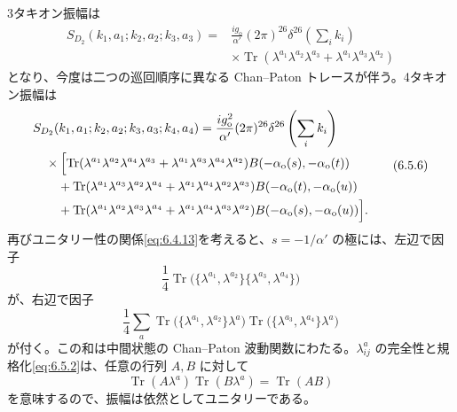 3タキオン振幅は
\begin{equation}
\begin{aligned}
S_{D_2}(k_1,a_1;k_2,a_2;k_3,a_3)
={}&\frac{ig_{\mathrm o}}{\alpha'}(2\pi)^{26}
\delta^{26}\left(\sum_i k_i\right)\\
&\times\operatorname{Tr}
(\lambda^{a_1}\lambda^{a_2}\lambda^{a_3}
+\lambda^{a_1}\lambda^{a_3}\lambda^{a_2})
\end{aligned}
\tag{6.5.5}\label{eq:6.5.5}
\end{equation}
となり、今度は二つの巡回順序に異なる Chan--Paton トレースが伴う。4タキオン振幅は
\begin{equation}
\begin{aligned}
&S_{D_2}(k_1,a_1;k_2,a_2;k_3,a_3;k_4,a_4)
=\frac{ig_{\mathrm o}^2}{\alpha'}(2\pi)^{26}
\delta^{26}\left(\sum_i k_i\right)\\
&\quad\times\Bigl[
\operatorname{Tr}(\lambda^{a_1}\lambda^{a_2}\lambda^{a_4}\lambda^{a_3}
+\lambda^{a_1}\lambda^{a_3}\lambda^{a_4}\lambda^{a_2})
B(-\alpha_{\mathrm o}(s),-\alpha_{\mathrm o}(t))\\
&\qquad+
\operatorname{Tr}(\lambda^{a_1}\lambda^{a_3}\lambda^{a_2}\lambda^{a_4}
+\lambda^{a_1}\lambda^{a_4}\lambda^{a_2}\lambda^{a_3})
B(-\alpha_{\mathrm o}(t),-\alpha_{\mathrm o}(u))\\
&\qquad+
\operatorname{Tr}(\lambda^{a_1}\lambda^{a_2}\lambda^{a_3}\lambda^{a_4}
+\lambda^{a_1}\lambda^{a_4}\lambda^{a_3}\lambda^{a_2})
B(-\alpha_{\mathrm o}(s),-\alpha_{\mathrm o}(u))
\Bigr].
\end{aligned}
\tag{6.5.6}\label{eq:6.5.6}
\end{equation}
再びユニタリー性の関係\eqref{eq:6.4.13}を考えると、$s=-1/\alpha'$ の極には、左辺で因子
\begin{equation}
\frac14\operatorname{Tr}
\bigl(\{\lambda^{a_1},\lambda^{a_2}\}\{\lambda^{a_3},\lambda^{a_4}\}\bigr)
\tag{6.5.7}\label{eq:6.5.7}
\end{equation}
が、右辺で因子
\begin{equation}
\frac14\sum_a
\operatorname{Tr}\bigl(\{\lambda^{a_1},\lambda^{a_2}\}\lambda^a\bigr)
\operatorname{Tr}\bigl(\{\lambda^{a_3},\lambda^{a_4}\}\lambda^a\bigr)
\tag{6.5.8}\label{eq:6.5.8}
\end{equation}
が付く。この和は中間状態の Chan--Paton 波動関数にわたる。$\lambda^a_{ij}$ の完全性と規格化\eqref{eq:6.5.2}は、任意の行列 $A,B$ に対して
\begin{equation}
\operatorname{Tr}(A\lambda^a)\operatorname{Tr}(B\lambda^a)
=\operatorname{Tr}(AB)
\tag{6.5.9}\label{eq:6.5.9}
\end{equation}
を意味するので、振幅は依然としてユニタリーである。

